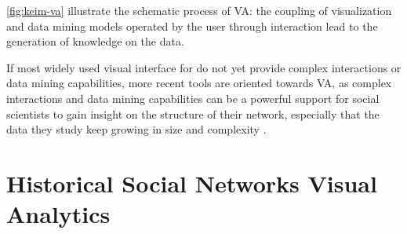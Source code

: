 \autoref{fig:keim-va} illustrate the schematic process of VA: the coupling of visualization and data mining models operated by the user through interaction lead to the generation of knowledge on the data.

If most widely used visual interface for \hsna do not yet provide complex interactions or data mining capabilities, more recent tools are oriented towards VA, as complex interactions and data mining capabilities can be a powerful support for social scientists to gain insight on the structure of their network, especially that the data they study keep growing in size and complexity \cite{kaplanVeniceTimeMachine2015}.




\section{Historical Social Networks Visual Analytics}\label{sec:intro-HSNV}


